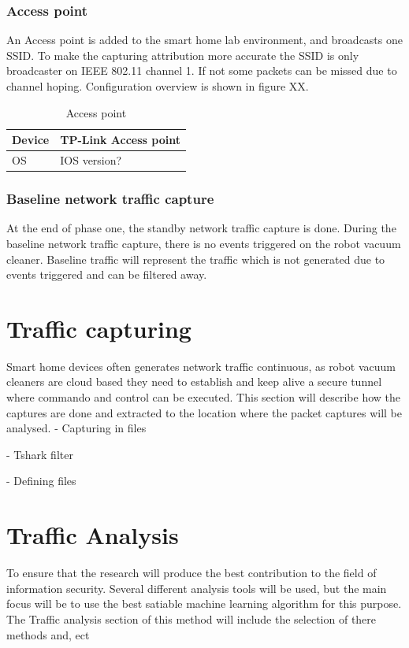 \subsubsection{Access point}
An Access point is added to the smart home lab environment, and broadcasts one SSID. To make the capturing attribution more accurate the SSID is only broadcaster on IEEE 802.11 channel 1. If not some packets can be missed due to channel hoping. Configuration overview is shown in figure XX. 

\begin{table}[!hbtp]
\centering
\caption{Access point}
    \begin{tabular}{|l|l|}
    \hline
        Device & TP-Link Access point \\ \hline
        OS     & IOS version?         \\ \hline
    \end{tabular}
\end{table}

\subsubsection{Baseline network traffic capture}
At the end of phase one, the standby network traffic capture is done. During the baseline network traffic capture, there is no events triggered on the robot vacuum cleaner. Baseline traffic will represent the traffic which is not generated due to events triggered and can be filtered away. 

\section{Traffic capturing}
Smart home devices often generates network traffic continuous, as robot vacuum cleaners are cloud based they need to establish and keep alive a secure tunnel where commando and control can be executed. This section will describe how the captures are done and extracted to the location where the packet captures will be analysed. 
- Capturing in files

- Tshark filter

- Defining files




\section{Traffic Analysis}
To ensure that the research will produce the best contribution to the field of information security. Several different analysis tools will be used, but the main focus will be to use the best satiable machine learning algorithm for this purpose. The Traffic analysis section of this method will include the selection of there methods and, ect    

